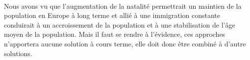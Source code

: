\paragraph{}Nous avons vu que l’augmentation de la natalité permettrait un maintien de la population en Europe à long terme et allié à une immigration constante conduirait à un accroissement de la population et à une stabilisation de l'âge moyen de la population. Mais il faut se rendre à l’évidence, ces approches n'apportera aucune solution à cours terme, elle doit donc être combiné à d’autre solutions.  

